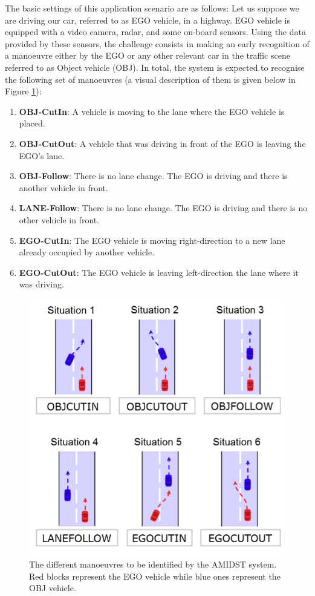 The basic settings of this application scenario are as follows: Let us suppose we are driving our car, referred to as EGO vehicle, in a highway. EGO vehicle is equipped with a video camera, radar, and some on-board sensors. Using the data provided by these sensors, the challenge consists in making an early recognition of a manoeuvre either by the EGO or any other relevant car in the traffic scene referred to as Object vehicle (OBJ). In total, the system is expected to recognise the following set of manoeuvres (a visual description of them is given below in Figure \ref{Figure:DaimlerManeuvers}):

\begin{enumerate}
\item \textbf{OBJ-CutIn}: A vehicle is moving to the lane where the EGO vehicle is placed.
\item \textbf{OBJ-CutOut}:  A vehicle that was driving in front of the EGO is leaving the EGO's lane.
\item \textbf{OBJ-Follow}: There is no lane change. The EGO is driving and there is another vehicle in front.
\item \textbf{LANE-Follow}: There is no lane change. The EGO is driving and there is no other vehicle in front.
\item \textbf{EGO-CutIn}: The EGO vehicle is moving right-direction to a new lane already occupied by another vehicle. 
\item \textbf{EGO-CutOut}: The EGO vehicle is leaving left-direction the lane where it was driving.
\end{enumerate}

\begin{figure}[ht!]
\begin{center}
\includegraphics[scale=0.4]{./figures/DaimlerManeuvers}
\caption{\label{Figure:DaimlerManeuvers}The different manoeuvres to be identified by the AMIDST system. Red blocks represent the EGO vehicle while blue ones represent the OBJ vehicle.}
\end{center}
\end{figure}

